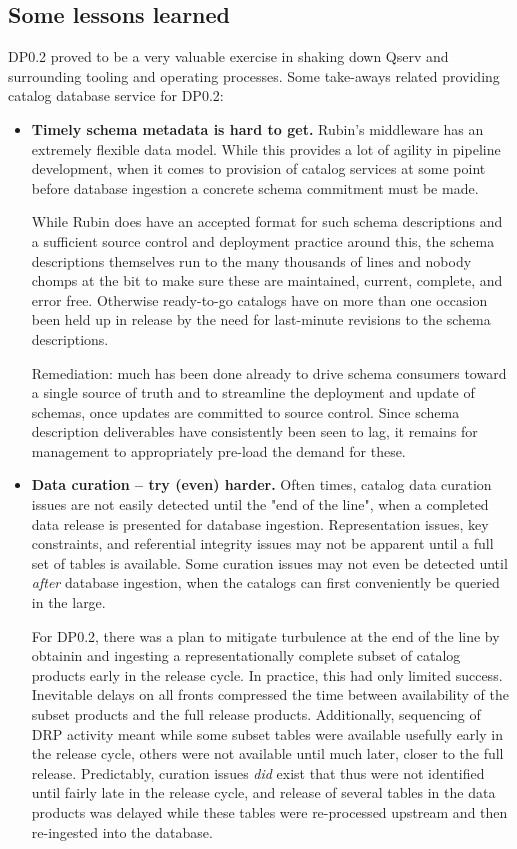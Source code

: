 \documentclass[OPS,authoryear,toc]{lsstdoc}
\begin{document}
\subsection{Some lessons learned}

DP0.2 proved to be a very valuable exercise in shaking down Qserv and surrounding tooling and operating
processes.  Some take-aways related providing catalog database service for DP0.2:

\begin{itemize}

\item
  \textbf{Timely schema metadata is hard to get.}  Rubin's middleware has an extremely flexible data
  model.  While this provides a lot of agility in pipeline development, when it comes to provision of
  catalog services at some point before database ingestion a concrete schema commitment must be made.

  While Rubin does have an accepted format for such schema descriptions and a sufficient source control and
  deployment practice around this, the schema descriptions themselves run to the many thousands of lines and
  nobody chomps at the bit to make sure these are maintained, current, complete, and error free.  Otherwise
  ready-to-go catalogs have on more than one occasion been held up in release by the need for last-minute
  revisions to the schema descriptions.

  Remediation: much has been done already to drive schema consumers toward a single source of truth and to
  streamline the deployment and update of schemas, once updates are committed to source control.  Since
  schema description deliverables have consistently been seen to lag, it remains for management to
  appropriately pre-load the demand for these.

\item
  \textbf{Data curation -- try (even) harder.}  Often times, catalog data curation issues are not easily
  detected until the "end of the line", when a completed data release is presented for database ingestion.
  Representation issues, key constraints, and referential integrity issues may not be apparent until a full
  set of tables is available.  Some curation issues may not even be detected until \emph{after} database
  ingestion, when the catalogs can first conveniently be queried in the large.

  For DP0.2, there was a plan to mitigate turbulence at the end of the line by obtainin and ingesting a
  representationally complete subset of catalog products early in the release cycle.  In practice, this had
  only limited success.  Inevitable delays on all fronts compressed the time between availability of the
  subset products and the full release products.  Additionally, sequencing of DRP activity meant while some
  subset tables were available usefully early in the release cycle, others were not available until much
  later, closer to the full release.  Predictably, curation issues \emph{did} exist that thus were not
  identified until fairly late in the release cycle, and release of several tables in the data products was
  delayed while these tables were re-processed upstream and then re-ingested into the database.


\end{itemize}
\end{document}
